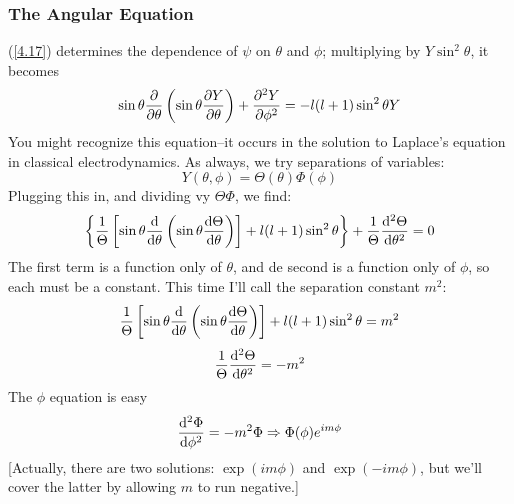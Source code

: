 \subsubsection{The Angular Equation}
(\ref{4.17}) determines the dependence of $\psi$ on $\theta$ and $\phi$; multiplying by $Y\sin^2\theta$, it becomes
\begin{equation}\label{4.18}
	\sin\theta\frac{\partial}{\partial\theta}\left(\sin\theta\pdv{Y}{\theta}\right)+\pdv[2]{Y}{\phi}=-l(l+1)\sin^2\theta Y
\end{equation}
You might recognize this equation--it occurs in the solution to Laplace's equation in classical electrodynamics. As always, we try separations of variables:
\begin{equation}\label{4.19}
	Y(\theta,\phi)=\Theta(\theta)\Phi(\phi)
\end{equation}
Plugging this in, and dividing vy $\Theta\Phi$, we find: $$\left\{\frac{1}{\Theta}\left[\sin\theta\dv{\theta}\left(\sin\theta\dv{\Theta}{\theta}\right)\right]+l(l+1)\sin^2\theta\right\}+\frac{1}{\Theta}\dv[2]{\Theta}{\theta}=0$$
The first term is a function only of $\theta$, and de second is a function only of $\phi$, so each must be a constant. This time I'll call the separation constant $m^2$:
\begin{equation}\label{4.20}
	\frac{1}{\Theta}\left[\sin\theta\dv{\theta}\left(\sin\theta\dv{\Theta}{\theta}\right)\right]+l(l+1)\sin^2\theta=m^2
\end{equation}
\begin{equation}\label{4.21}
	\frac{1}{\Theta}\dv[2]{\Theta}{\theta}=-m^2
\end{equation}
The $\phi$ equation is easy
\begin{equation}\label{4.22}
	\dv[2]{\Phi}{\phi}=-m^2\Phi\Rightarrow \Phi(\phi)e^{im\phi}
\end{equation}
[Actually, there are two solutions: $\exp(im\phi)$ and $\exp(-im\phi)$, but we'll cover the latter by allowing $m$ to run negative.]






























